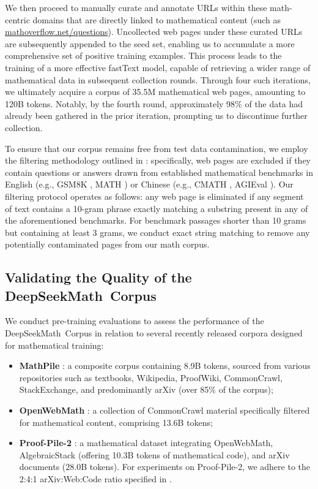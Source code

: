 We then proceed to manually curate and annotate URLs within these math-centric domains that are directly linked to mathematical content (such as \url{mathoverflow.net/questions}). Uncollected web pages under these curated URLs are subsequently appended to the seed set, enabling us to accumulate a more comprehensive set of positive training examples. This process leads to the training of a more effective fastText model, capable of retrieving a wider range of mathematical data in subsequent collection rounds. Through four such iterations, we ultimately acquire a corpus of 35.5M mathematical web pages, amounting to 120B tokens. Notably, by the fourth round, approximately 98\% of the data had already been gathered in the prior iteration, prompting us to discontinue further collection.

To ensure that our corpus remains free from test data contamination, we employ the filtering methodology outlined in \cite{deepseek-coder}: specifically, web pages are excluded if they contain questions or answers drawn from established mathematical benchmarks in English (e.g., GSM8K \citep{gsm8k}, MATH \citep{MATH}) or Chinese (e.g., CMATH \citep{wei2023cmath}, AGIEval \citep{agieval}). Our filtering protocol operates as follows: any web page is eliminated if any segment of text contains a 10-gram phrase exactly matching a substring present in any of the aforementioned benchmarks. For benchmark passages shorter than 10 grams but containing at least 3 grams, we conduct exact string matching to remove any potentially contaminated pages from our math corpus.

\subsection{Validating the Quality of the DeepSeekMath~Corpus}

We conduct pre-training evaluations to assess the performance of the DeepSeekMath~Corpus in relation to several recently released corpora designed for mathematical training:

\begin{itemize}[topsep=0pt]
    \item \textbf{MathPile} \citep{mathpile}: a composite corpus containing 8.9B tokens, sourced from various repositories such as textbooks, Wikipedia, ProofWiki, CommonCrawl, StackExchange, and predominantly arXiv (over 85\% of the corpus);
    \item \textbf{OpenWebMath} \citep{openwebmath}: a collection of CommonCrawl material specifically filtered for mathematical content, comprising 13.6B tokens;
    \item \textbf{Proof-Pile-2} \citep{llemma}: a mathematical dataset integrating OpenWebMath, AlgebraicStack (offering 10.3B tokens of mathematical code), and arXiv documents (28.0B tokens). For experiments on Proof-Pile-2, we adhere to the 2:4:1 arXiv:Web:Code ratio specified in \cite{llemma}.
\end{itemize}

